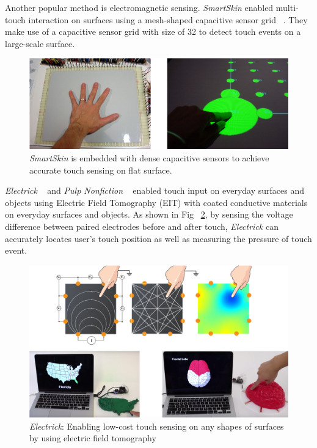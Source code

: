 Another popular method is electromagnetic sensing. \textit{SmartSkin} enabled multi-touch interaction on surfaces using a mesh-shaped capacitive sensor grid ~\cite{Rekimoto-SmartSkin}. They make use of a capacitive sensor grid with size of 32  to detect touch events on a large-scale surface. 
\begin{figure}[ht]
    \centering
	\includegraphics[width=0.88\columnwidth]{figures/smartskin.png}
	\setlength{\belowcaptionskip}{-6pt}
    \caption{\textit{SmartSkin} is embedded with dense capacitive sensors to achieve accurate touch sensing on flat surface.}
    \label{fig:smartskin}
\end{figure}

\textit{Electrick} ~\cite{Zhang-Electrick} and \textit{Pulp Nonfiction} ~\cite{Zhang-pulp} enabled touch input on everyday surfaces and objects using Electric Field Tomography (EIT) with coated conductive materials on everyday surfaces and objects. As shown in Fig ~\ref{fig:electrick}, by sensing the voltage difference between paired electrodes before and after touch, \textit{Electrick} can accurately locates user's touch position as well as measuring the pressure of touch event. 

\begin{figure}[ht]
    \centering
	\includegraphics[width=0.88\columnwidth]{figures/electrick.png}
	\setlength{\belowcaptionskip}{-6pt}
    \caption{\textit{Electrick}: Enabling low-cost touch sensing on any shapes of surfaces by using electric field tomography}
    \label{fig:electrick}
\end{figure}

